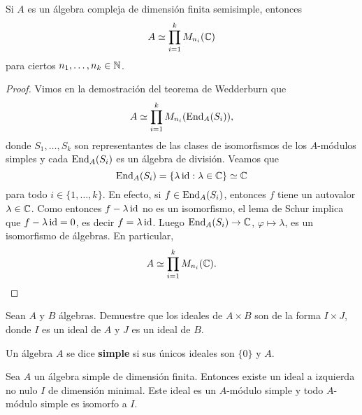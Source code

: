 \begin{corollary}[Mollien]
	Si $A$ es un álgebra compleja de dimensión finita semisimple, entonces
	\[
	A\simeq\prod_{i=1}^k M_{n_i}(\mathbb{C})
	\]  
	para ciertos $n_1,\dots,n_k\in\mathbb{N}$. 
\end{corollary}

\begin{proof}
	Vimos en la demostración del teorema de Wedderburn que 
	\[
	A\simeq \prod_{i=1}^k M_{n_i}(\operatorname{End}_A(S_i)),
	\]
	donde $S_1,\dots,S_k$ son representantes de las clases de 
	isomorfismos de los $A$-módulos simples y cada $\operatorname{End}_A(S_i)$ es un álgebra de división. 
	Veamos que 
	\[
	\operatorname{End}_A(S_i)=\{\lambda\operatorname{id}:\lambda\in\mathbb{C}\}\simeq\mathbb{C}
	\]
	para todo $i\in\{1,\dots,k\}$. En efecto, si 
	$f\in\operatorname{End}_A(S_i)$, entonces $f$ tiene un autovalor $\lambda\in\mathbb{C}$. Como entonces 
	$f-\lambda\operatorname{id}$ no es un isomorfismo, el lema de Schur implica que $f-\lambda\operatorname{id}=0$, 
	es decir $f=\lambda\operatorname{id}$. Luego $\operatorname{End}_A(S_i)\to\mathbb{C}$, $\varphi\mapsto\lambda$, 
	es un isomorfismo de álgebras. En particular, 
	\[
	A\simeq \prod_{i=1}^k M_{n_i}(\mathbb{C}).\qedhere
	\]
\end{proof}

\begin{exercise}
Sean $A$ y $B$ álgebras. Demuestre que los ideales de $A\times B$ son 
de la forma $I\times J$, donde $I$ es un ideal de $A$ y $J$ es un ideal de $B$. 
\end{exercise}

\begin{definition}
Un álgebra $A$ se dice \textbf{simple} si sus únicos ideales son $\{0\}$ y $A$. 
\end{definition}

%

\begin{proposition}
Sea $A$ un álgebra simple de dimensión finita. Entonces existe un ideal a izquierda no nulo $I$ de dimensión minimal. 
Este ideal es un $A$-módulo simple y todo $A$-módulo simple es isomorfo a $I$. 	
\end{proposition}

